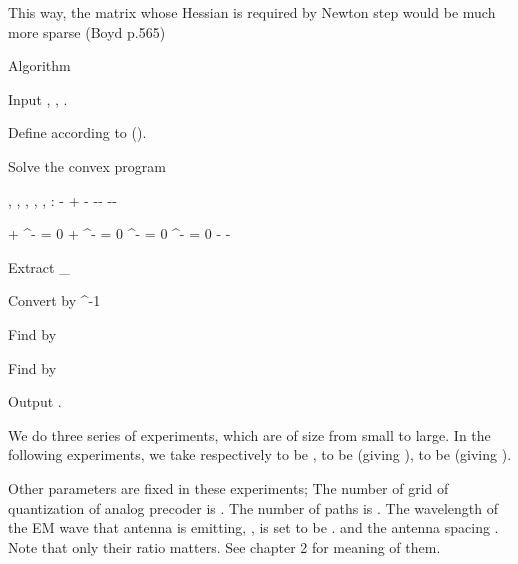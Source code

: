 This way, the matrix whose Hessian is required by Newton step would be much more sparse (Boyd p.565)


\Result
{Algorithm}
{
\startitemize[n]
%
\item Input , , .
%
\item Define  according to ().
%
\item Solve the convex program
%
 {
\NC \startcases
\NC \MC \fpU, \fpV, \fmU, \fmV, \sp, \sm: \NR
%
\NC \min
\MC {}
- 
+ 
-  \NR
%
\NC {} \;  \Q
\MC -\QU \fpU -\QV \fpV {} \NR
%
\NC \MC -\QU \fmU -\QV \fmV {} \NR

\NC \MC \DU \RB {\fpU - \fmU} + \QU ^\Tr \tp - \kpU = 0 \NR
%
\NC \MC \DU \RB {\fpU - \fmU} + \QU ^\Tr \tm - \kmU = 0 \NR
%
\NC \MC \QV ^\Tr \tp - \kpV = 0 \NR
%
\NC \MC \QV ^\Tr \tm - \kmV = 0 \NR
%
\NC \MC -\tp {} \NR
%
\NC \MC -\tm {} \NR
\stopcases \NR
}
%
\item Extract
%
 {
\NC {}
\LA \NC {} _{} \NR
}
%
\item Convert  by
%
 {
\NC {}
\LA \NC {} ^{-1}  \NR
}
%
\item Find  by
%
%
\item Find  by
%
%
\item Output .
%
\stopitemize
}

\stopsubsection

\stopsection


\startsection [title={Result}]

\startsubsection [title={Settings}]

We do three series of experiments, which are of size from small to large.
In the following experiments, we take respectively  to be ,  to be  (giving ),  to be  (giving ).

Other parameters are fixed in these experiments; 
The number of grid of quantization of analog precoder is .
The number of paths  is .
The wavelength of the EM wave that antenna is emitting, , is set to be .
and the antenna spacing .
Note that only their ratio matters.
See chapter 2 for meaning of them.

